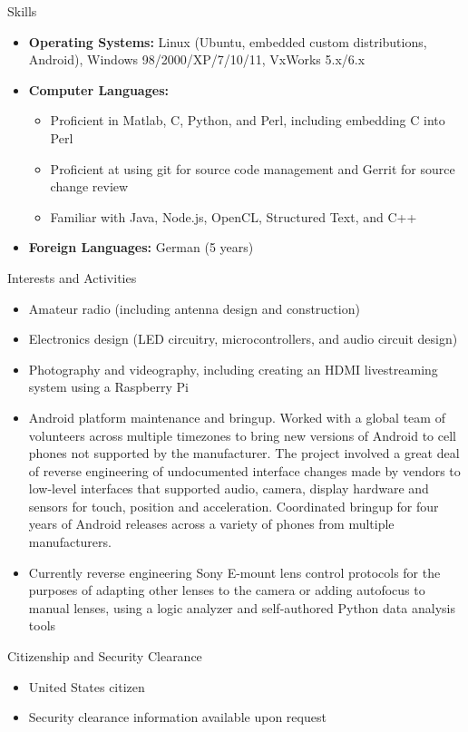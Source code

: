 \documentclass[10pt,oneside]{article}
\newenvironment{ressection}[1]{
	\vspace{4pt}
	{\Large#1}
	\begin{itemize}
	\vspace{3pt}
}{
	\end{itemize}
}
\newcommand{\resitem}[1]{
	\vspace{-4pt}
	\item \begin{flushleft} #1 \end{flushleft}
}
\newcommand{\ressubitem}[1]{
	\vspace{-1pt}
	\item \begin{flushleft} #1 \end{flushleft}
}
\newenvironment{reslist}[1]{
	\resitem{\textbf{#1}}
	\vspace{-5pt}
	\begin{itemize}
}{
	\end{itemize}
}
\newenvironment{ressection}[1]{
	\vspace{4pt}
	{\fontfamily{phv}\selectfont\Large#1}
	\begin{itemize}[leftmargin=12pt]
	\vspace{3pt}
}{
	\end{itemize}
}
\newcommand{\resitem}[1]{
	\vspace{-4pt}
	\item \begin{flushleft} #1 \end{flushleft}
}
\newcommand{\ressubitem}[1]{
	\vspace{-1pt}
	\item \begin{flushleft} #1 \end{flushleft}
}
\newenvironment{reslist}[1]{
	\resitem{\textbf{#1}}
	\vspace{-5pt}
	\begin{itemize}[leftmargin=12pt]
}{
	\end{itemize}
}
\begin{document}
\begin{ressection}{Skills}

	\resitem{\textbf{Operating Systems:} Linux (Ubuntu, embedded custom distributions, Android), Windows 98/2000/XP/7/10/11, VxWorks 5.x/6.x}

	\begin{reslist}{\textbf{Computer Languages:}}
	  	\ressubitem{Proficient in Matlab, C, Python, and Perl, including embedding C into Perl}
        \ressubitem{Proficient at using git for source code management and Gerrit for source change review}
	  	\ressubitem{Familiar with Java, Node.js, OpenCL, Structured Text, and C++}
	\end{reslist}

	\resitem{\textbf{Foreign Languages:} German (5 years)}

\end{ressection}

\begin{ressection}{Interests and Activities}
		\resitem{Amateur radio (including antenna design and construction)}
		\resitem{Electronics design (LED circuitry, microcontrollers, and audio circuit design)}
		\resitem{Photography and videography, including creating an HDMI livestreaming system using a Raspberry Pi}
	    \resitem{Android platform maintenance and bringup.  Worked with a global team of volunteers across multiple timezones to bring new versions of Android to cell phones not supported by the manufacturer.  The project involved a great deal of reverse engineering of undocumented interface changes made by vendors to low-level interfaces that supported audio, camera, display hardware and sensors for touch, position and acceleration.  Coordinated bringup for four years of Android releases across a variety of phones from multiple manufacturers.}
        \resitem{Currently reverse engineering Sony E-mount lens control protocols for the purposes of adapting other lenses to the camera or adding autofocus to manual lenses, using a logic analyzer and self-authored Python data analysis tools}
\end{ressection}

\begin{ressection}{Citizenship and Security Clearance}

	\resitem{United States citizen}

	\resitem{Security clearance information available upon request}

\end{ressection}
\end{document}
